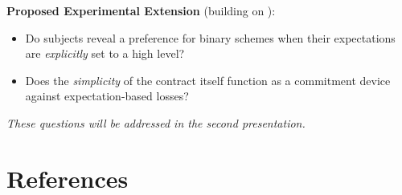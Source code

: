 \documentclass[12pt,a4paper,parskip=half]{scrartcl}
\begin{document}
\textbf{Proposed Experimental Extension} (building on \textcite{Abeler2011}):
\begin{itemize}
    \item Do subjects reveal a preference for binary schemes when their expectations are \emph{explicitly} set to a high level?
    \item Does the \emph{simplicity} of the contract itself function as a commitment device against expectation-based losses?
\end{itemize}

\bigskip

\small\textit{These questions will be addressed in the second presentation.}


\section*{References}
\printbibliography
\end{document}
